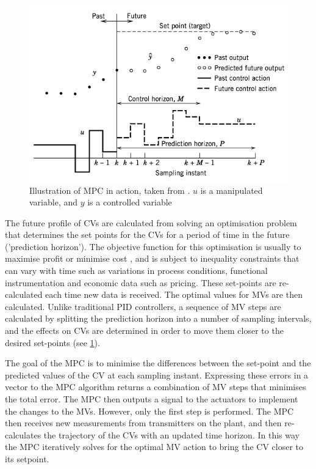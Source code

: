     \begin{figure}
        \centering
        \includegraphics[width=\linewidth]{chapters/4-operation-control/4-Figures/MPC-Seborg-2011.png}
        \caption{Illustration of MPC in action, taken from \textcite{}. $u$ is a manipulated variable, and $y$ is a controlled variable}
        \label{fig:MPC}
    \end{figure}
The future profile of CVs are calculated from solving an optimisation problem that determines the set points for the CVs for a period of time in the future ('prediction horizon'). The objective function for this optimisation is usually to maximise profit or minimise cost \cite{seborg_process_2011}, and is subject to inequality constraints that can vary with time such as variations in process conditions, functional instrumentation and economic data such as pricing. These set-points are re-calculated each time new data is received. The optimal values for MVs are then calculated. Unlike traditional PID controllers, a sequence of MV steps are calculated by splitting the prediction horizon into a number of sampling intervals, and the effects on CVs are determined in order to move them closer to the desired set-points (see \cref{fig:MPC}). 


The goal of the MPC is to minimise the differences between the set-point and the predicted values of the CV at each sampling instant. Expressing these errors in a vector to the MPC algorithm returns a combination of MV steps that minimises the total error. The MPC then outputs a signal to the actuators to implement the changes to the MVs. However, only the first step is performed. The MPC then receives new measurements from transmitters on the plant, and then re-calculates the trajectory of the CVs with an updated time horizon. In this way the MPC iteratively solves for the optimal MV action to bring the CV closer to its setpoint. 

